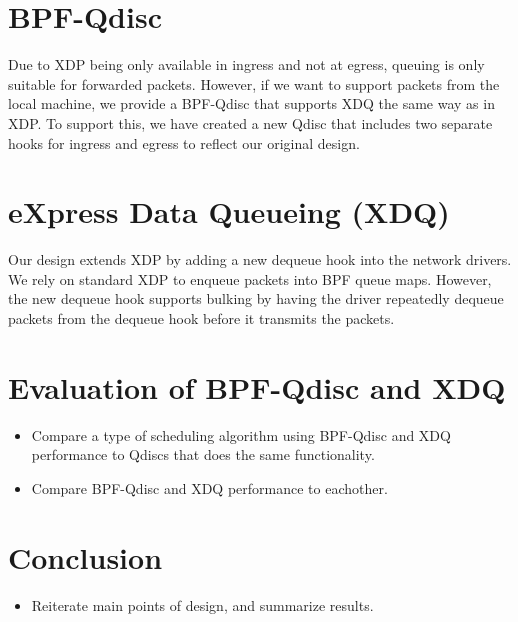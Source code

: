 \documentclass[sigconf, nonacm]{acmart}
\begin{document}
\section{BPF-Qdisc}

Due to XDP being only available in ingress and not at egress, queuing is only suitable for forwarded packets. However, if we want to support packets from the local machine, we provide a BPF-Qdisc that supports XDQ the same way as in XDP. To support this, we have created a new Qdisc that includes two separate hooks for ingress and egress to reflect our original design.


\section{eXpress Data Queueing (XDQ)}

Our design extends XDP by adding a new dequeue hook into the network drivers. We
rely on standard XDP to enqueue packets into BPF queue maps. However, the new
dequeue hook supports bulking by having the driver repeatedly dequeue packets
from the dequeue hook before it transmits the packets.


\section{Evaluation of BPF-Qdisc and XDQ}

\begin{itemize}
  \item Compare a type of scheduling algorithm using BPF-Qdisc and XDQ performance to Qdiscs that does the same functionality.
  \item Compare BPF-Qdisc and XDQ performance to eachother.
\end{itemize}

\section{Conclusion}

\begin{itemize}
  \item Reiterate main points of design, and summarize results.
\end{itemize}





\end{document}
